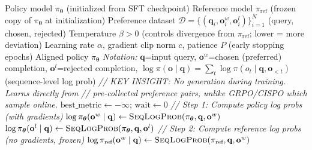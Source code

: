 \documentclass[11pt]{article}
\begin{document}
\begin{algorithm}[t]
\caption{DPO (Direct Preference Optimization)}\label{alg:dpo}
\begin{algorithmic}[1]
\Require Policy model $\pi_{\boldsymbol{\theta}}$ (initialized from SFT checkpoint)
\Require Reference model $\pi_{\text{ref}}$ (frozen copy of $\pi_{\boldsymbol{\theta}}$ at initialization)
\Require Preference dataset $\mathcal{D} = \{(\mathbf{q}_i, \mathbf{o}_i^w, \mathbf{o}_i^l)\}_{i=1}^N$
    (query, chosen, rejected)
\Require Temperature $\beta > 0$ (controls divergence from $\pi_{\text{ref}}$; lower = more deviation)
\Require Learning rate $\alpha$, gradient clip norm $c$, patience $P$ (early stopping epochs)
\Ensure Aligned policy $\pi_{\boldsymbol{\theta}}$
\Statex \textit{Notation:} $\mathbf{q}$=input query, $\mathbf{o}^w$=chosen (preferred) completion,
    $\mathbf{o}^l$=rejected completion,
\Statex \hspace{\algorithmicindent}$\log \pi(\mathbf{o} \mid \mathbf{q}) = \sum_t \log \pi(o_t \mid \mathbf{q}, \mathbf{o}_{<t})$ (sequence-level log prob)
\Statex
\Statex \hspace{\algorithmicindent}\textit{// KEY INSIGHT: No generation during training. Learns directly from}
\Statex \hspace{\algorithmicindent}\textit{// pre-collected preference pairs, unlike GRPO/CISPO which sample online.}
\State $\text{best\_metric} \gets -\infty$; $\text{wait} \gets 0$
        \Statex \hspace{\algorithmicindent}\hspace{\algorithmicindent}\textit{// Step 1: Compute policy log probs (with gradients)}
        \State $\log \pi_{\boldsymbol{\theta}}(\mathbf{o}^w \mid \mathbf{q}) \gets \Call{SeqLogProb}{\pi_{\boldsymbol{\theta}}, \mathbf{q}, \mathbf{o}^w}$
        \State $\log \pi_{\boldsymbol{\theta}}(\mathbf{o}^l \mid \mathbf{q}) \gets \Call{SeqLogProb}{\pi_{\boldsymbol{\theta}}, \mathbf{q}, \mathbf{o}^l}$
        \Statex \hspace{\algorithmicindent}\hspace{\algorithmicindent}\textit{// Step 2: Compute reference log probs (no gradients, frozen)}
        \State $\log \pi_{\text{ref}}(\mathbf{o}^w \mid \mathbf{q}) \gets \Call{SeqLogProb}{\pi_{\text{ref}}, \mathbf{q}, \mathbf{o}^w}$

\end{algorithmic}
\end{algorithm}
\end{document}
